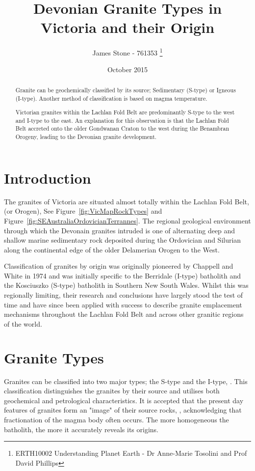\documentclass[a4paper]{article}
\title{Devonian Granite Types in Victoria and their Origin}
\author{James Stone - 761353 \thanks{ERTH10002 Understanding Planet Earth -  Dr Anne-Marie Tosolini and Prof David Phillips}}
\date{October 2015}
\begin{document}
\maketitle
\newpage

\begin{abstract}
Granite can be geochemically classified by its source; Sedimentary (S-type) or Igneous (I-type). 
Another method of classification is based on magma temperature.

Victorian granites within the Lachlan Fold Belt are predominantly S-type to the west and I-type to the east. An explanation for this observation is that the Lachlan Fold Belt accreted onto the older Gondwanan Craton to the west during the Benambran Orogeny, leading to the Devonian granite development.
\end{abstract}

\section{Introduction}

The granites of Victoria are situated almost totally within the Lachlan Fold Belt, (or Orogen), See Figure~\ref{fig:VicMapRockTypes} and Figure~\ref{fig:SEAustraliaOrdovicianTerrannes}. The regional geological environment through which the Devonain granites intruded is one of alternating deep and shallow marine sedimentary rock deposited during the Ordovician and Silurian along the continental edge of the older Delamerian Orogen to the West.

Classification of granites by origin was originally pioneered by Chappell and White in 1974 and was initially specific to the Berridale (I-type) batholith and the Kosciuszko (S-type) batholith in Southern New South Wales. Whilst this was regionally limiting, their research and conclusions have largely stood the test of time and have since been applied with success to describe granite emplacement mechanisms throughout the Lachlan Fold Belt and across other granitic regions of the world.

\section{Granite Types}

Granites can be classified into two major types; the S-type and the I-type, \cite{BWChappell}. This classification distinguishes the granites by their source and utilises both geochemical and petrological characteristics. It is accepted that the present day features of granites form an "image" of their source rocks, \cite{hine1978contrasts}, acknowledging that fractionation of the magma body often occurs. The more homogeneous the batholith, the more it accurately reveals its origins. 
\end{document}
